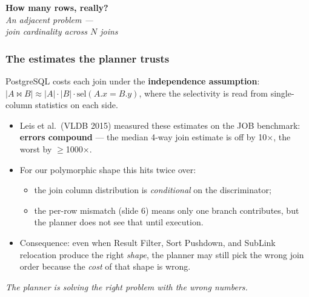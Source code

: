 \documentclass{beamer}
\begin{document}
{
\begin{frame}[plain]
\vspace*{\fill}
\begin{center}
{\Huge\bfseries\color{pgblue!85!black} How many rows, really?}\\[10mm]
{\large\itshape An adjacent problem ---\\join cardinality across $N$ joins}
\end{center}
\vspace*{\fill}
\end{frame}
}

%

\begin{frame}\frametitle{The estimates the planner trusts}
\vspace{-1mm}

PostgreSQL costs each join under the \textbf{independence
assumption}: $|A \bowtie B| \approx |A| \cdot |B| \cdot
\text{sel}(A.x = B.y)$, where the selectivity is read from
single-column statistics on each side.

\vspace{2mm}

\begin{itemize}\small
  \item Leis et al.\ (VLDB 2015) measured these estimates on the
        JOB benchmark:\\
        \textbf{errors compound} --- the median 4-way join estimate
        is off by 10$\times$, the worst by $\geq$1000$\times$.
  \item For our polymorphic shape this hits twice over:
        \begin{itemize}\scriptsize
          \item the join column distribution is \emph{conditional}
                on the discriminator;
          \item the per-row mismatch (slide 6) means only one branch
                contributes, but the planner does not see that
                until execution.
        \end{itemize}
  \item Consequence: even when Result Filter, Sort Pushdown, and
        SubLink relocation produce the right \emph{shape}, the
        planner may still pick the wrong join order because the
        \emph{cost} of that shape is wrong.
\end{itemize}

\vspace{1mm}
\begin{center}\small\itshape
The planner is solving the right problem with the wrong numbers.
\end{center}
\end{frame}
\end{document}
